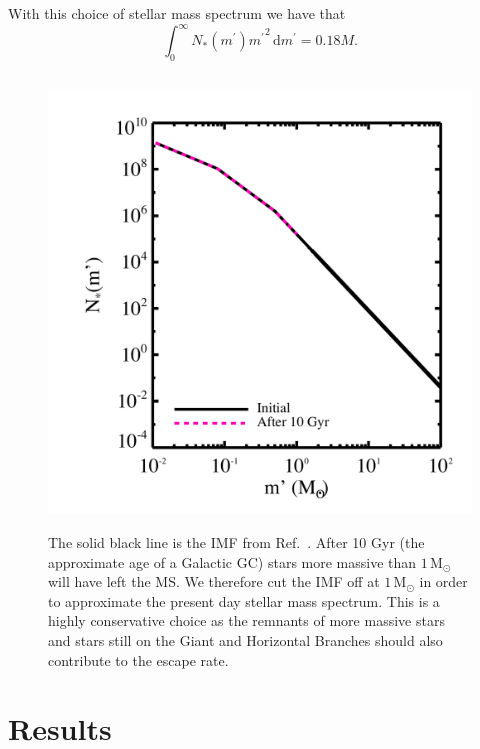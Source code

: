 \documentclass[aps,floatfix,prd,showpacs]{revtex4}
\newcommand{\diff}{\mathrm{d}}
\newcommand{\mpr}{m^\prime}
\newcommand{\Msun}{\textrm{M}_\odot}
\begin{document}
With this choice of stellar mass spectrum we have that
%
\begin{equation}
	\int^\infty_0{N_*(\mpr)\mpr}^2\,\diff \mpr = 0.18M.
\end{equation}
%
%
%
\begin{figure}[htp]
\centering
\includegraphics[width=12cm, height=12cm]{IMF}
\caption{The solid black line is the IMF from Ref.~\cite{Kroupa2001}. After 10 Gyr (the approximate age of a Galactic GC) stars more massive than $1\, \Msun$ will have left the MS.  We therefore cut the IMF off at $1\, \Msun$ in order to approximate the present day stellar mass spectrum.  This is a highly conservative choice as the remnants of more massive stars and stars still on the Giant and Horizontal Branches should also contribute to the escape rate.}
\label{IMF}
\end{figure}
%
%

\section{Results}
\label{section:results}
\end{document}
